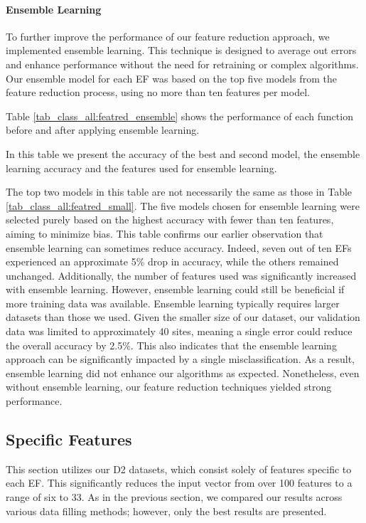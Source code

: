 \documentclass[12pt,letterpaper]{article}
\begin{document}
\paragraph{Ensemble Learning}
To further improve the performance of our feature reduction approach, we implemented ensemble learning.
This technique is designed to average out errors and enhance performance without the need for retraining or complex algorithms.
Our ensemble model for each \ac{EF} was based on the top five models from the feature reduction process, using no more than ten features per model.

Table \ref{tab_class_all:featred_ensemble} shows the performance of each function before and after applying ensemble learning.


In this table we present the accuracy of the best and second model, the ensemble learning accuracy and the features used for ensemble learning.

The top two models in this table are not necessarily the same as those in Table \ref{tab_class_all:featred_small}.
The five models chosen for ensemble learning were selected purely based on the highest accuracy with fewer than ten features, aiming to minimize bias.
This table confirms our earlier observation that ensemble learning can sometimes reduce accuracy.
Indeed, seven out of ten \acp{EF} experienced an approximate 5\% drop in accuracy, while the others remained unchanged.
Additionally, the number of features used was significantly increased with ensemble learning.
However, ensemble learning could still be beneficial if more training data was available.
Ensemble learning typically requires larger datasets than those we used.
Given the smaller size of our dataset, our validation data was limited to approximately 40 sites, meaning a single error could reduce the overall accuracy by 2.5\%.
This also indicates that the ensemble learning approach can be significantly impacted by a single misclassification.
As a result, ensemble learning did not enhance our algorithms as expected.
Nonetheless, even without ensemble learning, our feature reduction techniques yielded strong performance.


\subsection{Specific Features}\label{sec:class_spec}
This section utilizes our D2 datasets, which consist solely of features specific to each \ac{EF}.
This significantly reduces the input vector from over 100 features to a range of six to 33.
As in the previous section, we compared our results across various data filling methods; however, only the best results are presented.
\end{document}
